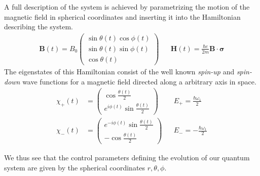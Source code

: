\documentclass{article}
\begin{document}
A full description of the system is achieved by parametrizing the motion of the magnetic field in spherical coordinates and inserting it into the Hamiltonian describing the system.
      \begin{align*}
        \bm{B}(t) = B_{0} \begin{pmatrix} 
                                          \sin\theta(t)\cos\phi(t)\\
                                          \sin\theta(t)\sin\phi(t)\\
                                          \cos\theta(t)
                           \end{pmatrix}
        && \bm{H}(t) = \frac{\hbar e}{2m}\bm{B} \cdot \bm{\sigma}
      \end{align*}
The eigenstates of this Hamiltonian consist of the well known \textit{spin-up} and \textit{spin-down} wave functions for a magnetic field directed along a arbitrary axis in space. 
      \begin{align*}
        \chi_{+}(t) &= \begin{pmatrix} 
                                      \cos\frac{\theta(t)}{2}\\
                                      e^{i\phi(t)} \sin \frac{\theta(t)}{2}
                       \end{pmatrix} 
                       && E_{+} = \frac{\hbar \omega_{1}}{2}\\
       \chi_{-}(t) &= \begin{pmatrix} 
                                     e^{-i\phi(t)}\sin\frac{\theta(t)}{2}\\
                                     -\cos\frac{\theta(t)}{2}
                       \end{pmatrix} 
                       && E_{-} = -\frac{\hbar \omega_{1}}{2}
      \end{align*}

We thus see that the control parameters defining the evolution of our quantum system are given by the spherical coordinates $r, \theta, \phi$.\\
\end{document}
